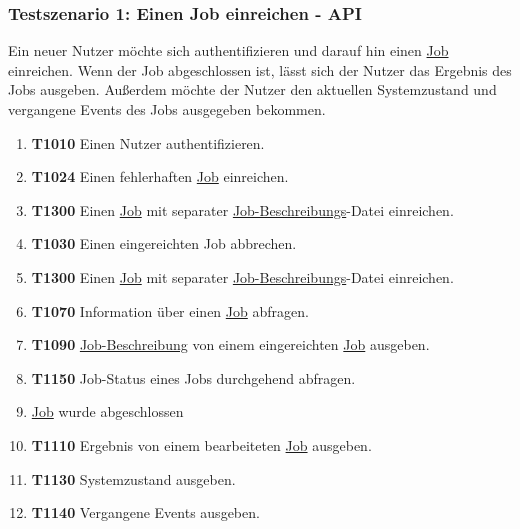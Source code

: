 \subsubsection{Testszenario 1: Einen Job einreichen - API}
Ein neuer \gls{Nutzer} möchte sich authentifizieren und darauf hin einen \hyperref[B:Jobs]{Job} einreichen. Wenn der Job abgeschlossen ist, lässt sich der \gls{Nutzer} das Ergebnis des Jobs ausgeben. Außerdem möchte der \gls{Nutzer} den aktuellen Systemzustand und vergangene Events des Jobs ausgegeben bekommen.

\begin{enumerate}
    \item \textbf{T1010} Einen \gls{Nutzer} authentifizieren.
    
    \item \textbf{T1024} Einen fehlerhaften \hyperref[B:Jobs]{Job} einreichen.
    
    \item \textbf{T1300} Einen \hyperref[B:Jobs]{Job} mit separater \hyperref[B:Job-Beschreibung]{Job-Beschreibungs}-Datei einreichen. 
    
    \item \textbf{T1030} Einen eingereichten Job abbrechen.
    
    \item \textbf{T1300} Einen \hyperref[B:Jobs]{Job} mit separater \hyperref[B:Job-Beschreibung]{Job-Beschreibungs}-Datei einreichen. 
    
    \item \textbf{T1070} Information über einen \hyperref[B:Jobs]{Job} abfragen.
    
    \item \textbf{T1090} \hyperref[B:Job-Beschreibung]{Job-Beschreibung} von einem eingereichten \hyperref[B:Jobs]{Job} ausgeben.
    
    \item \textbf{T1150} Job-Status eines Jobs durchgehend abfragen.
    
    \item \hyperref[B:Jobs]{Job} wurde abgeschlossen 
    
    \item \textbf{T1110} Ergebnis von einem bearbeiteten \hyperref[B:Jobs]{Job} ausgeben. 
    
    \item \textbf{T1130} Systemzustand ausgeben. 
    
    \item \textbf{T1140} Vergangene Events ausgeben. 
    
\end{enumerate}

